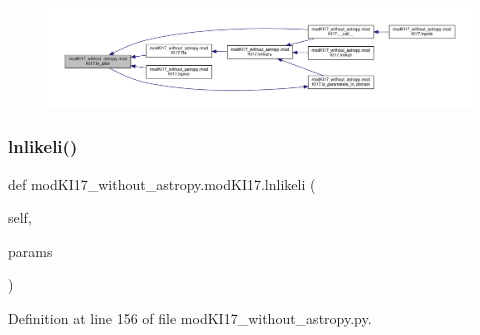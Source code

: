 \begin{figure}[H]
\begin{center}
\leavevmode
\includegraphics[width=350pt]{d3/df4/classmodKI17__without__astropy_1_1modKI17_a4ebd2891cdc0426fcb517062f49c19d6_icgraph}
\end{center}
\end{figure}
\mbox{\label{classmodKI17__without__astropy_1_1modKI17_aa78ac0827335ae5b100709d37d06e946}} 
\subsubsection{\texorpdfstring{lnlikeli()}{lnlikeli()}}
{\footnotesize\ttfamily def mod\+K\+I17\+\_\+without\+\_\+astropy.\+mod\+K\+I17.\+lnlikeli (\begin{DoxyParamCaption}\item[{}]{self,  }\item[{}]{params }\end{DoxyParamCaption})}



Definition at line 156 of file mod\+K\+I17\+\_\+without\+\_\+astropy.\+py.


